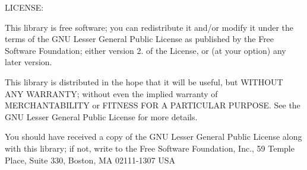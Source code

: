 \-L\-I\-C\-E\-N\-S\-E\-:

\-This library is free software; you can redistribute it and/or modify it under the terms of the \-G\-N\-U \-Lesser \-General \-Public \-License as published by the \-Free \-Software \-Foundation; either version 2. of the \-License, or (at your option) any later version.

\-This library is distributed in the hope that it will be useful, but \-W\-I\-T\-H\-O\-U\-T \-A\-N\-Y \-W\-A\-R\-R\-A\-N\-T\-Y; without even the implied warranty of \-M\-E\-R\-C\-H\-A\-N\-T\-A\-B\-I\-L\-I\-T\-Y or \-F\-I\-T\-N\-E\-S\-S \-F\-O\-R \-A \-P\-A\-R\-T\-I\-C\-U\-L\-A\-R \-P\-U\-R\-P\-O\-S\-E. \-See the \-G\-N\-U \-Lesser \-General \-Public \-License for more details.

\-You should have received a copy of the \-G\-N\-U \-Lesser \-General \-Public \-License along with this library; if not, write to the \-Free \-Software \-Foundation, \-Inc., 59 \-Temple \-Place, \-Suite 330, \-Boston, \-M\-A 02111-\/1307 \-U\-S\-A

